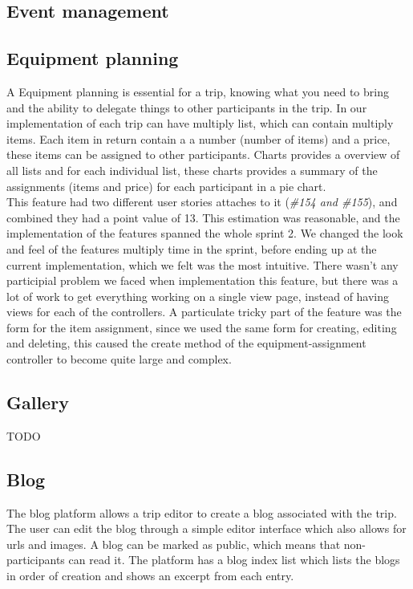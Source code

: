 \documentclass[a4paper]{article}
\begin{document}
\subsection{Event management}
\subsection{Equipment planning}
A Equipment planning is essential for a trip, knowing what you need to bring and the ability to delegate things to other participants in the trip. In our implementation of each trip can have multiply list, which can contain multiply items. Each item in return contain a a number (number of items) and a price, these items can be assigned to other participants. Charts provides a overview of all lists and for each individual list, these charts provides a summary of the assignments (items and price) for each participant in a pie chart. \\ This feature had two different user stories attaches to it (\emph{\#154 and \#155}), and combined they had a point value of 13. This estimation was reasonable, and the implementation of the features spanned the whole sprint 2. We changed the look and feel of the features multiply time in the sprint, before ending up at the current implementation, which we felt was the most intuitive. There wasn't any participial problem we faced when implementation this feature, but there was a lot of work to get everything working on a single view page, instead of having views for each of the controllers. A particulate tricky part of the feature was the form for the item assignment, since we used the same form for creating, editing and deleting, this caused the create method of the equipment-assignment controller to become quite large and complex. 

\subsection{Gallery}
TODO


\subsection{Blog}
The blog platform allows a trip editor to create a blog associated with the trip. The user can edit the blog through a simple editor interface which also allows for urls and images. A blog can be marked as public, which means that non-participants can read it. The platform has a blog index list which lists the blogs in order of creation and shows an excerpt from each entry.\\
\end{document}
